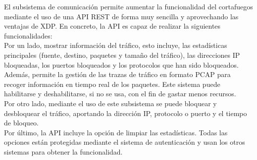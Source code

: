 El subsistema de comunicación permite aumentar la funcionalidad del cortafuegos mediante el uso de una API REST de forma muy sencilla y aprovechando las ventajas de XDP. En concreto, la API es capaz de realizar la siguientes funcionalidades:
\\ Por un lado, mostrar información del tráfico, esto incluye, las estadísticas principales (fuente, destino, paquetes y tamaño del tráfico), las direcciones IP bloqueadas, los puertos bloqueados y los protocolos que han sido bloqueados.
\\ Además, permite la gestión de las trazas de tráfico en formato PCAP para recoger información en tiempo real de los paquetes. Este sistema puede habilitarse y deshabilitarse, si no se usa, con el fin de gastar menos recursos.
\\Por otro lado, mediante el uso de este subsistema se puede bloquear y desbloquear el tráfico, aportando la dirección IP, protocolo o puerto y el tiempo de bloqueo.
\\Por último, la API incluye la opción de limpiar las estadísticas. Todas las opciones están protegidas mediante el sistema de autenticación y usan los otros sistemas para obtener la funcionalidad.